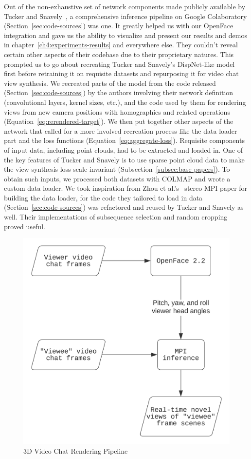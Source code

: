 Out of the non-exhaustive set of network components made publicly available by Tucker and Snavely~\cite{single_view_mpi}, a comprehensive inference pipeline on Google Colaboratory (Section~\ref{sec:code-sources}) was one. It greatly helped us with our OpenFace integration and gave us the ability to visualize and present our results and demos in chapter~\ref{ch4:experiments-results} and everywhere else. They couldn't reveal certain other aspects of their codebase due to their proprietary natures. This prompted us to go about recreating Tucker and Snavely's DispNet-like model~\cite{mayer_large_2016} first before retraining it on requisite datasets and repurposing it for video chat view synthesis. We recreated parts of the model from the code released (Section~\ref{sec:code-sources}) by the authors involving their network definition (convolutional layers, kernel sizes, etc.), and the code used by them for rendering views from new camera positions with homographies and related operations (Equation~\ref{eq:rerendered-target}). We then put together other aspects of the network that called for a more involved recreation process like the data loader part and the loss functions (Equation~\ref{eq:aggregate-loss}). Requisite components of input data, including point clouds, had to be extracted and loaded in. One of the key features of Tucker and Snavely is to use sparse point cloud data to make the view synthesis loss scale-invariant (Subsection~\ref{subsec:base-papers}). To obtain such inputs, we processed both datasets with COLMAP and wrote a custom data loader. We took inspiration from Zhou et al.'s~\cite{zhou2018stereo} stereo MPI paper for building the data loader, for the code they tailored to load in data (Section~\ref{sec:code-sources}) was refactored and reused by Tucker and Snavely as well. Their implementations of subsequence selection and random cropping proved useful.

\begin{figure}[!h]
    \includegraphics[width=0.60\columnwidth]{figures/3d-video-chat-rendering-pipeline.png}
    \caption{3D Video Chat Rendering Pipeline}
    \label{fig:3d-video-chat-rendering-pipeline}
\end{figure}

